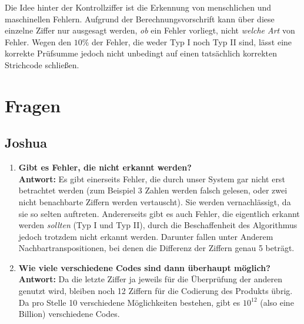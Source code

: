 \documentclass[a4paper,12pt]{article}
\begin{document}
Die Idee hinter der Kontrollziffer ist die Erkennung von menschlichen und maschinellen Fehlern. Aufgrund der Berechnungsvorschrift kann über diese einzelne Ziffer nur ausgesagt werden, \textit{ob} ein Fehler vorliegt, nicht \textit{welche Art} von Fehler. Wegen den $10 \%$ der Fehler, die weder Typ I noch Typ II sind, lässt eine korrekte Prüfsumme jedoch nicht unbedingt auf einen tatsächlich korrekten Strichcode schließen.

\section{Fragen}
\subsection{Joshua}
\begin{enumerate}
\item{\textbf{Gibt es Fehler, die nicht erkannt werden?}\\
  \textbf{Antwort:} Es gibt einerseits Fehler, die durch unser System gar nicht erst betrachtet werden (zum Beispiel 3 Zahlen werden falsch gelesen, oder zwei nicht benachbarte Ziffern werden vertauscht). Sie werden vernachlässigt, da sie so selten auftreten. Andererseits gibt es auch Fehler, die eigentlich erkannt werden \textit{sollten} (Typ I und Typ II), durch die Beschaffenheit des Algorithmus jedoch trotzdem nicht erkannt werden. Darunter fallen unter Anderem Nachbartranspositionen, bei denen die Differenz der Ziffern genau 5 beträgt.}
\item{\textbf{Wie viele verschiedene Codes sind dann überhaupt möglich?}\\
  \textbf{Antwort:} Da die letzte Ziffer ja jeweils für die Überprüfung der anderen genutzt wird, bleiben noch 12 Ziffern für die Codierung des Produkts übrig. Da pro Stelle 10 verschiedene Möglichkeiten bestehen, gibt es $10^{12}$ (also eine Billion) verschiedene Codes.}
\end{enumerate}
\end{document}
